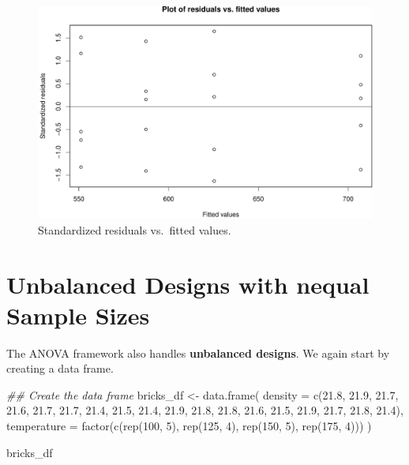 \documentclass[
  letterpaper,
]{scrbook}
\newenvironment{Shaded}{\begin{snugshade}}{\end{snugshade}}
\newcommand{\AttributeTok}[1]{\textcolor[rgb]{0.40,0.45,0.13}{#1}}
\newcommand{\DecValTok}[1]{\textcolor[rgb]{0.68,0.00,0.00}{#1}}
\newcommand{\DocumentationTok}[1]{\textcolor[rgb]{0.37,0.37,0.37}{\textit{#1}}}
\newcommand{\FloatTok}[1]{\textcolor[rgb]{0.68,0.00,0.00}{#1}}
\newcommand{\FunctionTok}[1]{\textcolor[rgb]{0.28,0.35,0.67}{#1}}
\newcommand{\NormalTok}[1]{\textcolor[rgb]{0.00,0.23,0.31}{#1}}
\newcommand{\OtherTok}[1]{\textcolor[rgb]{0.00,0.23,0.31}{#1}}
\begin{document}
\begin{figure}[H]

{\centering \includegraphics{unit5-factor/crbd_files/figure-pdf/residuals-vs-fitted-1.pdf}

}

\caption{Standardized residuals vs.~fitted values.}

\end{figure}%

\section{Unbalanced Designs with nequal Sample
Sizes}\label{unbalanced-designs-with-nequal-sample-sizes}

The ANOVA framework also handles \textbf{unbalanced designs}. We again
start by creating a data frame.

\begin{Shaded}
\begin{Highlighting}[]
\DocumentationTok{\#\# Create the data frame}
\NormalTok{bricks\_df }\OtherTok{\textless{}{-}} \FunctionTok{data.frame}\NormalTok{(}
  \AttributeTok{density =} \FunctionTok{c}\NormalTok{(}\FloatTok{21.8}\NormalTok{, }\FloatTok{21.9}\NormalTok{, }\FloatTok{21.7}\NormalTok{, }\FloatTok{21.6}\NormalTok{, }\FloatTok{21.7}\NormalTok{,}
              \FloatTok{21.7}\NormalTok{, }\FloatTok{21.4}\NormalTok{, }\FloatTok{21.5}\NormalTok{, }\FloatTok{21.4}\NormalTok{,}
              \FloatTok{21.9}\NormalTok{, }\FloatTok{21.8}\NormalTok{, }\FloatTok{21.8}\NormalTok{, }\FloatTok{21.6}\NormalTok{, }\FloatTok{21.5}\NormalTok{,}
              \FloatTok{21.9}\NormalTok{, }\FloatTok{21.7}\NormalTok{, }\FloatTok{21.8}\NormalTok{, }\FloatTok{21.4}\NormalTok{),}
  \AttributeTok{temperature =} \FunctionTok{factor}\NormalTok{(}\FunctionTok{c}\NormalTok{(}\FunctionTok{rep}\NormalTok{(}\DecValTok{100}\NormalTok{, }\DecValTok{5}\NormalTok{), }\FunctionTok{rep}\NormalTok{(}\DecValTok{125}\NormalTok{, }\DecValTok{4}\NormalTok{), }\FunctionTok{rep}\NormalTok{(}\DecValTok{150}\NormalTok{, }\DecValTok{5}\NormalTok{), }\FunctionTok{rep}\NormalTok{(}\DecValTok{175}\NormalTok{, }\DecValTok{4}\NormalTok{)))}
\NormalTok{)}

\NormalTok{bricks\_df}
\end{Highlighting}
\end{Shaded}
\end{document}
